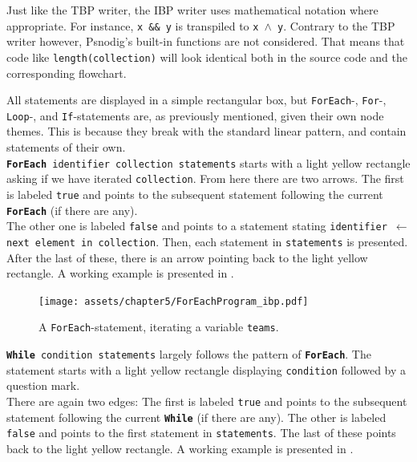 Just like the TBP writer, the IBP writer uses mathematical notation where appropriate. For instance, \texttt{x \&\& y} is transpiled to \texttt{x $\land$ y}. Contrary to the TBP writer however, Psnodig's built-in functions are not considered. That means that code like \texttt{length(collection)} will look identical both in the source code and the corresponding flowchart. \\

\newpage

All statements are displayed in a simple rectangular box, but \texttt{ForEach}-, \texttt{For}-, \texttt{Loop}-, and \texttt{If}-statements are, as previously mentioned, given their own node themes. This is because they break with the standard linear pattern, and contain statements of their own. \\

\texttt{\textbf{ForEach} identifier collection statements} starts with a light yellow rectangle asking if we have iterated \texttt{collection}. From here there are two arrows. The first is labeled \texttt{true} and points to the subsequent statement following the current \texttt{\textbf{ForEach}} (if there are any). \\

The other one is labeled \texttt{false} and points to a statement stating \texttt{identifier $\gets$ next element in collection}. Then, each statement in \texttt{statements} is presented. After the last of these, there is an arrow pointing back to the light yellow rectangle. A working example is presented in . \\

\begin{figure}[ht]
    \centering
    \texttt{[image: assets/chapter5/ForEachProgram\_ibp.pdf]}
    \caption{A \texttt{ForEach}-statement, iterating a variable \texttt{teams}.}
    \label{flochartForEach}
\end{figure}

\texttt{\textbf{While} condition statements} largely follows the pattern of \texttt{\textbf{ForEach}}. The statement starts with a light yellow rectangle displaying \texttt{condition} followed by a question mark. \\

There are again two edges: The first is labeled \texttt{true} and points to the subsequent statement following the current \texttt{\textbf{While}} (if there are any). The other is labeled \texttt{false} and points to the first statement in \texttt{statements}. The last of these points back to the light yellow rectangle. A working example is presented in . \\

